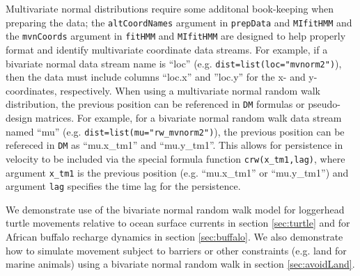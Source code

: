 \documentclass[12pt]{article}\usepackage[]{graphicx}\usepackage[]{xcolor}
\begin{document}
Multivariate normal distributions require some additonal book-keeping when preparing the data; the \verb|altCoordNames| argument in \verb|prepData| and \verb|MIfitHMM| and the \verb|mvnCoords| argument in \verb|fitHMM| and \verb|MIfitHMM| are designed to help properly format and identify multivariate coordinate data streams. For example, if a bivariate normal data stream name is ``loc'' (e.g. \verb|dist=list(loc="mvnorm2")|), then the data must include columns ``loc.x'' and ''loc.y'' for the x- and y- coordinates, respectively. When using a multivariate normal random walk distribution, the previous position can be referenced in \verb|DM| formulas or pseudo-design matrices. For example, for a bivariate normal random walk data stream named ``mu'' (e.g. \verb|dist=list(mu="rw_mvnorm2")|), the previous position can be refereced in \verb|DM| as ``mu.x\_tm1'' and ``mu.y\_tm1''. This allows for persistence in velocity to be included via the special formula function \verb|crw(x_tm1,lag)|, where argument \verb|x_tm1| is the previous position (e.g. ``mu.x\_tm1'' or ``mu.y\_tm1'') and argument \verb|lag| specifies the time lag for the persistence.

We demonstrate use of the bivariate normal random walk model for loggerhead turtle movements relative to ocean surface currents in section \ref{sec:turtle} and for African buffalo recharge dynamics in section \ref{sec:buffalo}. We also demonstrate how to simulate movement subject to barriers or other constraints (e.g. land for marine animals) using a bivariate normal random walk in section \ref{sec:avoidLand}.
\end{document}
